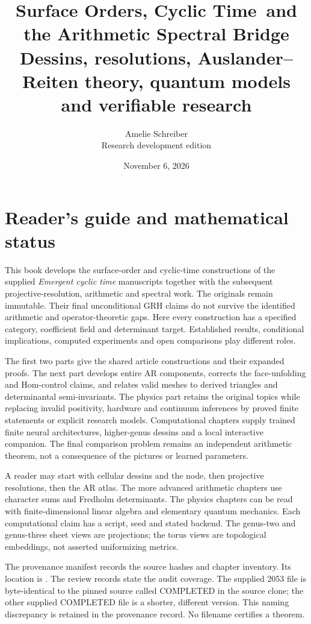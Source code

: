 \documentclass[11pt,oneside,openany]{book}
\title{Surface Orders, Cyclic Time\ and the Arithmetic Spectral Bridge\\[1em]\large Dessins, resolutions, Auslander--Reiten theory, quantum models and verifiable research}
\author{Amelie Schreiber\\\small Research development edition}
\date{November 6, 2026}
\theoremstyle{definition}\newtheorem{definition}[theorem]{Definition}
\theoremstyle{remark}\newtheorem{remark}[theorem]{Remark}
\begin{document}
\frontmatter\hypersetup{pageanchor=false}\maketitle\clearpage\hypersetup{pageanchor=true}
\chapter*{Reader's guide and mathematical status}
This book develops the surface-order and cyclic-time constructions of the supplied \emph{Emergent cyclic time} manuscripts together with the subsequent projective-resolution, arithmetic and spectral work. The originals remain immutable. Their final unconditional GRH claims do not survive the identified arithmetic and operator-theoretic gaps. Here every construction has a specified category, coefficient field and determinant target. Established results, conditional implications, computed experiments and open comparisons play different roles.

The first two parts give the shared article constructions and their expanded proofs. The next part develops entire AR components, corrects the face-unfolding and Hom-control claims, and relates valid meshes to derived triangles and determinantal semi-invariants. The physics part retains the original topics while replacing invalid positivity, hardware and continuum inferences by proved finite statements or explicit research models. Computational chapters supply trained finite neural architectures, higher-genus dessins and a local interactive companion. The final comparison problem remains an independent arithmetic theorem, not a consequence of the pictures or learned parameters.

A reader may start with cellular dessins and the node, then projective resolutions, then the AR atlas. The more advanced arithmetic chapters use character sums and Fredholm determinants. The physics chapters can be read with finite-dimensional linear algebra and elementary quantum mechanics. Each computational claim has a script, seed and stated backend. The genus-two and genus-three sheet views are projections; the torus views are topological embeddings, not asserted uniformizing metrics.

The provenance manifest records the source hashes and chapter inventory. Its location is . The review records state the audit coverage. The supplied 2053 file is byte-identical to the pinned source called COMPLETED in the source clone; the other supplied COMPLETED file is a shorter, different version. This naming discrepancy is retained in the provenance record. No filename certifies a theorem.
\end{document}
